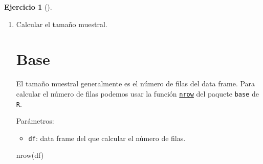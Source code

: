 \documentclass[
  a4paper,
]{scrreport}
\newenvironment{Shaded}{\begin{snugshade}}{\end{snugshade}}
\newcommand{\ExtensionTok}[1]{\textcolor[rgb]{0.00,0.23,0.31}{#1}}
\newcommand{\FunctionTok}[1]{\textcolor[rgb]{0.28,0.35,0.67}{#1}}
\newcommand{\NormalTok}[1]{\textcolor[rgb]{0.00,0.23,0.31}{#1}}
\providecommand{\tightlist}{%
  \setlength{\itemsep}{0pt}\setlength{\parskip}{0pt}}\usepackage{longtable,booktabs,array}
\theoremstyle{definition}
\newtheorem{exercise}{Ejercicio}[chapter]
\theoremstyle{remark}
\begin{document}
\begin{exercise}[]
\begin{enumerate}
\begin{tcolorbox}
  \section{Copilot}

\begin{Shaded}
\begin{Highlighting}[]
\ExtensionTok{Se}\NormalTok{ realizó una encuesta a 40 personas de más de 70 años sobre el número de medicamentos distintos que tomaban habitualmente.}

\ExtensionTok{Crear}\NormalTok{ un data frame de nombre df con una columna llamada medicamentos que contenga los siguientes valores: 3, 1, 2, 2, 0, 1, 4, 2, 3, 5, 1, 3, 2, 3, 1, 4, 2, 4, 3, 2, 3, 5, 0, 1, 2, 0, 2, 3, 0, 1, 1, 5, 3, 4, 2, 3, 0, 1, 2 y 3.}
\end{Highlighting}
\end{Shaded}

  \end{tcolorbox}
\item
  Calcular el tamaño muestral.

  \begin{tcolorbox}[enhanced jigsaw, colframe=quarto-callout-tip-color-frame, toprule=.15mm, bottomtitle=1mm, breakable, opacitybacktitle=0.6, toptitle=1mm, colback=white, bottomrule=.15mm, title=\textcolor{quarto-callout-tip-color}{\faLightbulb}\hspace{0.5em}{Solución}, arc=.35mm, left=2mm, titlerule=0mm, rightrule=.15mm, coltitle=black, leftrule=.75mm, opacityback=0, colbacktitle=quarto-callout-tip-color!10!white]

  \section{Base}

  El tamaño muestral generalmente es el número de filas del data frame.
  Para calcular el número de filas podemos usar la función
  \href{https://www.rdocumentation.org/packages/base/versions/3.6.2/topics/nrow}{\texttt{nrow}}
  del paquete \texttt{base} de \texttt{R}.

  Parámetros:

  \begin{itemize}
  \tightlist
  \item
    \texttt{df}: data frame del que calcular el número de filas.
  \end{itemize}

\begin{Shaded}
\begin{Highlighting}[]
\FunctionTok{nrow}\NormalTok{(df)}
\end{Highlighting}
\end{Shaded}


\end{tcolorbox}
\end{enumerate}
\end{exercise}
\end{document}
